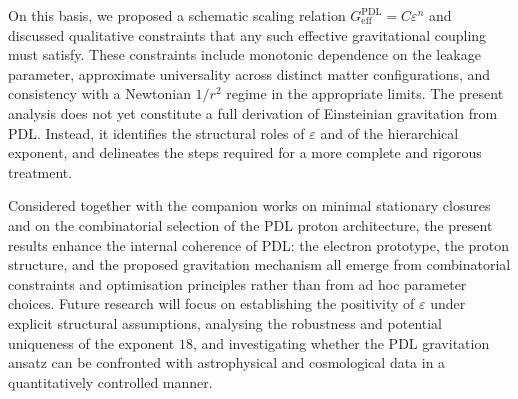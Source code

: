 \documentclass[11pt,a4paper]{article}
\theoremstyle{definition}
\newcommand{\PDL}{\mathrm{PDL}}
\begin{document}
On this basis, we proposed a schematic scaling relation $G_{\mathrm{eff}}^{\PDL} = C \varepsilon^{n}$ and discussed qualitative constraints that any such effective gravitational coupling must satisfy. These constraints include monotonic dependence on the leakage parameter, approximate universality across distinct matter configurations, and consistency with a Newtonian $1/r^2$ regime in the appropriate limits.\cite{Exponent_18_PDL_2026,Effective_Fields_PDL_2026} The present analysis does not yet constitute a full derivation of Einsteinian gravitation from PDL. Instead, it identifies the structural roles of $\varepsilon$ and of the hierarchical exponent, and delineates the steps required for a more complete and rigorous treatment.

Considered together with the companion works on minimal stationary closures and on the combinatorial selection of the PDL proton architecture, the present results enhance the internal coherence of PDL: the electron prototype, the proton structure, and the proposed gravitation mechanism all emerge from combinatorial constraints and optimisation principles rather than from ad hoc parameter choices.\cite{PDL_Main_2026,Combinatorial_Proton_v2_2026,Exponent_18_PDL_2026} Future research will focus on establishing the positivity of $\varepsilon$ under explicit structural assumptions, analysing the robustness and potential uniqueness of the exponent $18$, and investigating whether the PDL gravitation ansatz can be confronted with astrophysical and cosmological data in a quantitatively controlled manner.\cite{Topological_Reformulation_PDL_2026,PDL_Global_Mapping_2026}


\nocite{*}

\end{document}
